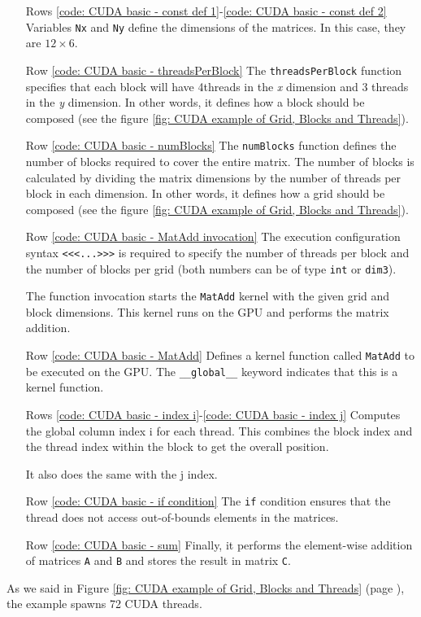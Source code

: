 \begin{itemize}
    \item[Rows \ref{code: CUDA basic - const def 1}-\ref{code: CUDA basic - const def 2}] Variables \texttt{Nx} and \texttt{Ny} define the dimensions of the matrices. In this case, they are $12 \times 6$.
    
    \item[Row \ref{code: CUDA basic - threadsPerBlock}] The \texttt{threadsPerBlock} function specifies that each block will have 4\break threads in the \emph{x} dimension and 3 threads in the \emph{y} dimension. In other words, it defines how a block should be composed (see the figure \ref{fig: CUDA example of Grid, Blocks and Threads}).

    \item[Row \ref{code: CUDA basic - numBlocks}] The \texttt{numBlocks} function defines the number of blocks required to cover the entire matrix. The number of blocks is calculated by dividing the matrix dimensions by the number of threads per block in each dimension. In other words, it defines how a grid should be composed (see the figure \ref{fig: CUDA example of Grid, Blocks and Threads}).

    \item[Row \ref{code: CUDA basic - MatAdd invocation}] The execution configuration syntax \texttt{<}\texttt{<}\texttt{<}\texttt{...}\texttt{>}\texttt{>}\texttt{>} is required to specify the number of threads per block and the number of blocks per grid (both numbers can be of type \texttt{int} or \texttt{dim3}).
    
    The function invocation starts the \texttt{MatAdd} kernel with the given grid and block dimensions. This kernel runs on the GPU and performs the matrix addition.

    \item[Row \ref{code: CUDA basic - MatAdd}] Defines a kernel function called \texttt{MatAdd} to be executed on the GPU. The \texttt{\_\_global\_\_} keyword indicates that this is a kernel function.
    
    \item[Rows \ref{code: CUDA basic - index i}-\ref{code: CUDA basic - index j}] Computes the global column index i for each thread. This combines the block index and the thread index within the block to get the overall position.
    
    It also does the same with the j index.

    \item[Row \ref{code: CUDA basic - if condition}] The \texttt{if} condition ensures that the thread does not access out-of-bounds elements in the matrices.
    
    \item[Row \ref{code: CUDA basic - sum}] Finally, it performs the element-wise addition of matrices \texttt{A} and \texttt{B} and stores the result in matrix \texttt{C}.
\end{itemize}
As we said in Figure \ref{fig: CUDA example of Grid, Blocks and Threads} (page \pageref{fig: CUDA example of Grid, Blocks and Threads}), the example spawns 72 CUDA threads.